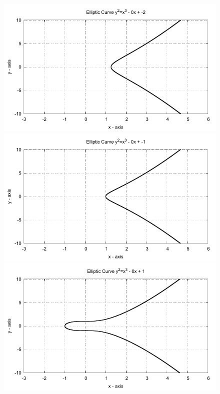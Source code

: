 \begin{figure}[!htbp]

  \begin{minipage}{0.3\textwidth} \centering
    \includegraphics{../Images/ecc_plot/1}
  \end{minipage}
  \begin{minipage}{0.3\textwidth} \centering
    \includegraphics{../Images/ecc_plot/2}
  \end{minipage}
  \begin{minipage}{0.3\textwidth} \centering
    \includegraphics{../Images/ecc_plot/3}
  \end{minipage}
\end{figure}

